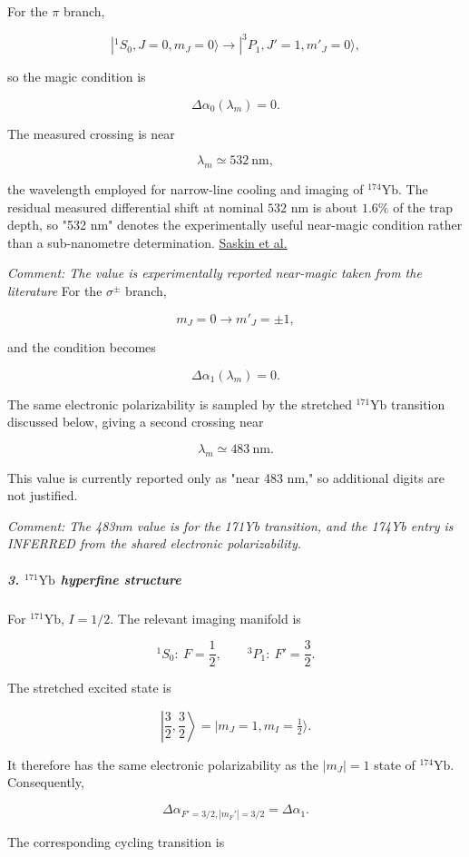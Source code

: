 For the $\pi$ branch,

\[
|^1S_0,J=0,m_J=0\rangle \longrightarrow |^3P_1,J'=1,m'_J=0\rangle,
\]

so the magic condition is

\[
\Delta\alpha_0(\lambda_m)=0.
\]

The measured crossing is near

\[
{\lambda_m\simeq532\ \mathrm{nm}},
\]

the wavelength employed for narrow-line cooling and imaging of $^{174}\mathrm{Yb}$. The residual measured differential shift at nominal $532$ nm is about $1.6\%$ of the trap depth, so "532 nm" denotes the experimentally useful near-magic condition rather than a sub-nanometre determination. \href{\detokenize{https://arxiv.org/abs/1810.10517}}{Saskin et al.}

{\textit{Comment: The value is experimentally reported near-magic taken from the literature}}
For the $\sigma^\pm$ branch,

\[
m_J=0\longrightarrow m'_J=\pm1,
\]

and the condition becomes

\[
\Delta\alpha_1(\lambda_m)=0.
\]

The same electronic polarizability is sampled by the stretched $^{171}\mathrm{Yb}$ transition discussed below, giving a second crossing near

\[
{\lambda_m\simeq483\ \mathrm{nm}}.
\]

This value is currently reported only as "near 483 nm," so additional digits are not justified.

{\textit{Comment: The 483nm value is for the 171Yb transition, and the 174Yb entry is INFERRED from the shared electronic polarizability. }}

\subparagraph*{3. $^{171}\mathrm{Yb}$ hyperfine structure}

For $^{171}\mathrm{Yb}$, $I=1/2$. The relevant imaging manifold is

\[
^1S_0:\ F=\frac12, \qquad ^3P_1:\ F'=\frac32.
\]

The stretched excited state is

\[
\left|\frac32,\frac32\right\rangle = |m_J=1,m_I=\tfrac12\rangle.
\]

It therefore has the same electronic polarizability as the $|m_J|=1$ state of $^{174}\mathrm{Yb}$. Consequently,

\[
\Delta\alpha_{F'=3/2,|m_F'|=3/2} = \Delta\alpha_1.
\]

The corresponding cycling transition is

